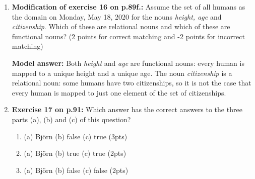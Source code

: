 \documentclass[a4,11pt]{article}
\begin{document}
\begin{enumerate}[leftmargin = 12pt]
\begin{enumerate}[noitemsep]
 	 \item R6 =  \{ $\langle$ 1, 1 $\rangle$, $\langle$ 1, 0 $\rangle$ \} \\ (-2 checked / 2 unchecked)
	 
  	 \item R7 =  \{ $\langle$ 1, 1 $\rangle$, $\langle$ 0, 1 $\rangle$ \} \\ (2 checked / -2 unchecked)
	 
\end{enumerate}

{\bf Model answer:} The relations R1, R2, R4, R5 and R7 are functions: in each of these, all elements of the domain of the relation are mapped to exactly one element of the codomain of the relation. 

The relations in R3 and R6 are not functions. R3 is not a function because `alex' is an element of the set P but not mapped to any element of the set H. R6 is not a function because the element `1' of T occurs as the first element of two pairs that differ on the second element, i.e., `1' is once mapped to `1' and once to `0'.

\item {\bf Modification of exercise 16 on p.89f.:} Assume the set of all humans as the domain on Monday, May 18, 2020 for the nouns {\em height, age} and {\em citizenship}. Which of these are relational nouns and which of these are functional nouns? (2 points for correct matching and -2 points for incorrect matching)


{\bf Model answer:} Both {\em height} and {\em age} are functional nouns: every human is mapped to a unique height and a unique age. The noun {\em citizenship} is a relational noun: some humans have two citizenships, so it is not the case that every human is mapped to just one element of the set of citizenships.

\item {\bf Exercise 17 on p.91:} Which answer has the correct answers to the three parts (a), (b) and (c) of this question?

\begin{enumerate}[noitemsep]
        \item (a) Bj\"orn (b) false (c) true (3pts)
        
         \item (a) Bj\"orn (b) true (c) true (2pts)
         
          \item (a) Bj\"orn (b) false (c) false (2pts)
          

\end{enumerate}
\end{enumerate}
\end{document}
